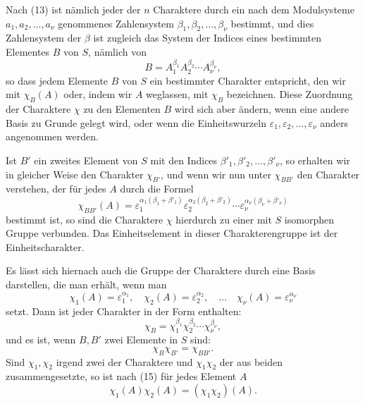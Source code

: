 \documentclass[11pt]{article}
\begin{document}
Nach (13) ist nämlich jeder der $n$ Charaktere durch ein nach dem Modulsysteme $a_1,a_2,
\ldots,a_\nu$ genommenes Zahlensystem $\beta_1,
\beta_2,
\ldots,
\beta_\nu$ bestimmt, und dies Zahlensystem der $\beta$ ist zugleich das System der Indices eines bestimmten Elementes $B$ von $S$, nämlich von
\begin{equation}
B=A_1^{\beta_1}A_2^{\beta_2}\cdots A_\nu^{\beta_\nu},
\tag{14}
\end{equation}
so dass jedem Elemente $B$ von $S$ ein bestimmter Charakter entspricht, den wir mit $\chi_B(A)$ oder, indem wir $A$ weglassen, mit $\chi_B$ bezeichnen. Diese Zuordnung der Charaktere $\chi$ zu den Elementen $B$ wird sich aber ändern, wenn eine andere Basis zu Grunde gelegt wird, oder wenn die Einheitswurzeln $\varepsilon_1,
\varepsilon_2,
\ldots,
\varepsilon_\nu$ anders angenommen werden.

Ist $B'$ ein zweites Element von $S$ mit den Indices $\beta'_1,
\beta'_2,
\ldots,
\beta'_\nu$, so erhalten wir in gleicher Weise den Charakter $\chi_{B'}$, und wenn wir nun unter $\chi_{BB'}$ den Charakter verstehen, der für jedes $A$ durch die Formel
\begin{equation}
\chi_{BB'}(A)=
\varepsilon_1^{\alpha_1(\beta_1+\beta'_1)}
\varepsilon_2^{\alpha_2(\beta_2+\beta'_2)}
\cdots
\varepsilon_\nu^{\alpha_\nu(\beta_\nu+\beta'_\nu)}
\tag{15}
\end{equation}
bestimmt ist, so sind die Charaktere $\chi$ hierdurch zu einer mit $S$ isomorphen Gruppe verbunden. Das Einheitselement in dieser Charakterengruppe ist der Einheitscharakter.

Es lässt sich hiernach auch die Gruppe der Charaktere durch eine Basis darstellen, die man erhält, wenn man
\begin{equation}
\chi_1(A)=\varepsilon_1^{\alpha_1},
\quad \chi_2(A)=\varepsilon_2^{\alpha_2},
\quad\ldots\quad
\chi_\nu(A)=\varepsilon_\nu^{\alpha_\nu}
\tag{16}
\end{equation}
setzt. Dann ist jeder Charakter in der Form enthalten:
\begin{equation}
\chi_B=\chi_1^{\beta_1}\chi_2^{\beta_2}\cdots\chi_\nu^{\beta_\nu},
\tag{17}
\end{equation}
und es ist, wenn $B,B'$ zwei Elemente in $S$ sind:
\begin{equation}
\chi_B\chi_{B'}=\chi_{BB'}.
\tag{18}
\end{equation}
Sind $\chi_1,\chi_2$ irgend zwei der Charaktere und $\chi_1\chi_2$ der aus beiden zusammengesetzte, so ist nach (15) für jedes Element $A$
\begin{equation}
\chi_1(A)\chi_2(A)=(\chi_1\chi_2)(A).
\tag{19}
\end{equation}
\end{document}
